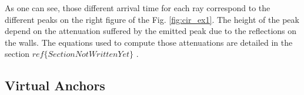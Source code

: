As one can see, those different arrival time for each ray correspond to the different peaks on the right figure of the Fig. \ref{fig:cir_ex1}. The height of the peak depend on the attenuation suffered by the emitted peak due to the reflections on the walls. The equations used to compute those attenuations are detailed in the section \color{red} $ref\{SectionNotWrittenYet\}$ \color{black}. 

\subsection{Virtual Anchors}

\cite{meissner2010uwb}

